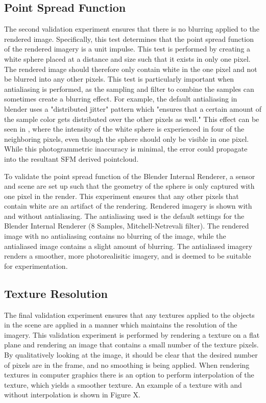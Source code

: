 

\subsection{Point Spread Function}
The second validation experiment ensures that there is no blurring applied to the rendered image.  Specifically, this test determines that the point spread function of the rendered imagery is a unit impulse.  This test is performed by creating a white sphere placed at a distance and size such that it exists in only one pixel.  The rendered image should therefore only contain white in the one pixel and not be blurred into any other pixels.  This test is particularly important when antialiasing is performed, as the sampling and filter to combine the samples can sometimes create a blurring effect.  For example, the default antialiasing in blender uses a "distributed jitter" pattern which "ensures that a certain amount of the sample color gets distributed over the other pixels as well."  This effect can be seen in , where the intensity of the white sphere is experienced in four of the neighboring pixels, even though the sphere should only be visible in one pixel.  While this photogrammetric inaccuracy is minimal, the error could propagate into the resultant SFM derived pointcloud.



To validate the point spread function of the Blender Internal Renderer, a sensor and scene are set up such that the geometry of the sphere is only captured with one pixel in the render.  This experiment ensures that any other pixels that contain white are an artifact of the rendering.  Rendered imagery is shown with and without antialiasing.  The antialiasing used is the default settings for the Blender Internal Renderer (8 Samples, Mitchell-Netrevali filter).  The rendered image with no antialiasing contains no blurring of the image, while the antialiased image contains a slight amount of blurring.  The antialiased imagery renders a smoother, more photorealisitic imagery, and is deemed to be suitable for experimentation. 

\subsection{Texture Resolution}
The final validation experiment ensures that any textures applied to the objects in the scene are applied in a manner which maintains the resolution of the imagery.  This validation experiment is performed by rendering a texture on a flat plane and rendering an image that contains a small number of the texture pixels.  By qualitatively looking at the image, it should be clear that the desired number of pixels are in the frame, and no smoothing is being applied.  When rendering textures in computer graphics there is an option to perform interpolation of the texture, which yields a smoother texture.  An example of a texture with and without interpolation is shown in Figure X. 

